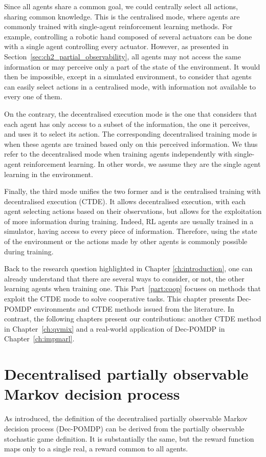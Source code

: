Since all agents share a common goal, we could centrally select all actions, sharing common knowledge.
This is the centralised mode, where agents are commonly trained with single-agent reinforcement learning methods.
For example, controlling a robotic hand composed of several actuators can be done with a single agent controlling every actuator.
However, as presented in Section~\ref{sec:ch2_partial_observability}, all agents may not access the same information or may perceive only a part of the state of the environment.
It would then be impossible, except in a simulated environment, to consider that agents can easily select actions in a centralised mode, with information not available to every one of them.

On the contrary, the decentralised execution mode is the one that considers that each agent has only access to a subset of the information, the one it perceives, and uses it to select its action.
The corresponding decentralised training mode is when these agents are trained based only on this perceived information.
We thus refer to the decentralised mode when training agents independently with single-agent reinforcement learning.
In other words, we assume they are the single agent learning in the environment.

Finally, the third mode unifies the two former and is the centralised training with decentralised execution (CTDE).
It allows decentralised execution, with each agent selecting actions based on their observations, but allows for the exploitation of more information during training.
Indeed, RL agents are usually trained in a simulator, having access to every piece of information.
Therefore, using the state of the environment or the actions made by other agents is commonly possible during training.

Back to the research question highlighted in Chapter \ref{ch:introduction}, one can already understand that there are several ways to consider, or not, the other learning agents when training one.
This Part~\ref{part:coop} focuses on methods that exploit the CTDE mode to solve cooperative tasks.
This chapter presents Dec-POMDP environments and CTDE methods issued from the literature. 
In contrast, the following chapters present our contributions: another CTDE method in Chapter~\ref{ch:qvmix} and a real-world application of Dec-POMDP in Chapter~\ref{ch:impmarl}.


\section{Decentralised partially observable Markov decision process}
\label{sec:ch3_decpomdp}
As introduced, the definition of the decentralised partially observable Markov decision process (Dec-POMDP) \citep{DecPomdp} can be derived from the partially observable stochastic game definition.
It is substantially the same, but the reward function maps only to a single real, a reward common to all agents.

